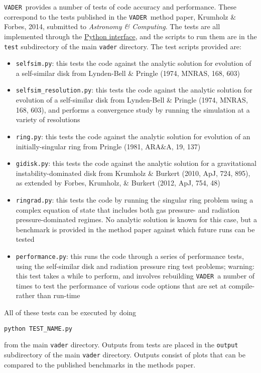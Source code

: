\documentclass[12pt]{article}
\newcommand{\vader}{\texttt{VADER}}
\begin{document}
\vader\ provides a number of tests of code accuracy and performance. These correspond to the tests published in the \vader\ method paper, Krumholz \& Forbes, 2014, submitted to \textit{Astronomy \& Computing}. The tests are all implemented through the \hyperref[sec:python]{Python interface}, and the scripts to run them are in the \verb=test= subdirectory of the main \verb=vader= directory. The test scripts provided are:
\begin{itemize}
\item \texttt{selfsim.py}: this tests the code against the analytic solution for evolution of a self-similar disk from Lynden-Bell \& Pringle (1974, MNRAS, 168, 603)
\item \verb=selfsim_resolution.py=: this tests the code against the analytic solution for evolution of a self-similar disk from Lynden-Bell \& Pringle (1974, MNRAS, 168, 603), and performs a convergence study by running the simulation at a variety of resolutions
\item \texttt{ring.py}: this tests the code against the analytic solution for evolution of an initially-singular ring from Pringle (1981, ARA\&A, 19, 137)
\item \texttt{gidisk.py}: this tests the code against the analytic solution for a gravitational instability-dominated disk from Krumholz \& Burkert (2010, ApJ, 724, 895), as extended by Forbes, Krumholz, \& Burkert (2012, ApJ, 754, 48)
\item \texttt{ringrad.py}: this tests the code by running the singular ring problem using a complex equation of state that includes both gas pressure- and radiation pressure-dominated regimes. No analytic solution is known for this case, but a benchmark is provided in the method paper against which future runs can be tested
\item \texttt{performance.py}: this runs the code through a series of performance tests, using the self-similar disk and radiation pressure ring test problems; warning: this test takes a while to perform, and involves rebuilding \vader\ a number of times to test the performance of various code options that are set at compile- rather than run-time
\end{itemize}
All of these tests can be executed by doing
\begin{verbatim}
python TEST_NAME.py
\end{verbatim}
from the main \texttt{vader} directory. Outputs from tests are placed in the \verb=output= subdirectory of the main \verb=vader= directory. Outputs consist of plots that can be compared to the published benchmarks in the methods paper.
\end{document}
